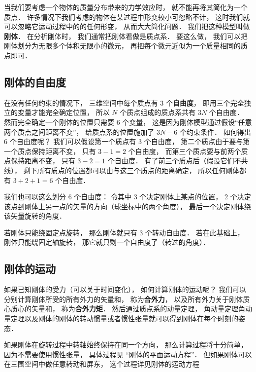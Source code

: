 

当我们要考虑一个物体的质量分布带来的力学效应时， 就不能再将其简化为一个质点． 许多情况下我们考虑的物体在某过程中形变较小可忽略不计， 这时我们就可以忽略它运动过程中的的任何形变， 从而大大简化问题． 我们把这种模型叫做\textbf{刚体}． 在分析刚体时， 我们通常把刚体看做是质点系． 要这么做， 我们可以把刚体划分为无限多个体积无限小的微元， 再把每个微元近似为一个质量相同的质点即可． 

\subsection{刚体的自由度}

在没有任何约束的情况下， 三维空间中每个质点有 3 个\textbf{自由度}， 即用三个完全独立的变量才能完全确定位置， 所以 $N$ 个质点组成的质点系共有 $3N$ 个自由度． 然而完全确定一个刚体的位置只需要 6 个变量， 这是因为刚体模型通过假设“任意两个质点之间距离不变”， 给质点系的位置施加了 $3N - 6$ 个约束条件． 如何得出 6 个自由度呢？ 我们可以假设第一个质点有 3 个自由度， 第二个质点由于要与第一个质点保持距离不变， 只有 $3 - 1 = 2$ 个自由度， 而第三个质点要与前两个质点保持距离不变， 只有 $3 - 2 = 1$ 个自由度． 有了前三个质点后（假设它们不共线）， 剩下所有质点的位置都可以由与这三个质点的距离确定， 所以任何刚体都有 $3 + 2 + 1 = 6$ 个自由度．

我们也可以这么划分 6 个自由度： 令其中 3 个决定刚体上某点的位置， 2 个决定该点到刚体上另一点的矢量的方向（球坐标中的两个角度）， 最后一个决定刚体绕该矢量旋转的角度．

若刚体只能绕固定点旋转， 那么刚体就只有 3 个转动自由度． 若在此基础上， 刚体只能绕固定轴旋转， 那它就只剩一个自由度了（转过的角度）．

\subsection{刚体的运动}
如果已知刚体的受力（可以关于时间变化）， 如何计算刚体的运动呢？ 我们可以分别计算刚体所受的所有外力的矢量和， 称为\textbf{合外力}， 以及所有外力关于刚体质心质心的矢量和， 称为\textbf{合外力矩}． 然后通过质点系的动量定理， 角动量定理角动量定理以及刚体的刚体的转动惯量或者惯性张量就可以得到刚体在每个时刻的姿态．

如果刚体在旋转过程中转轴始终保持在同一个方向， 那么计算过程将十分简单， 因为不需要使用惯性张量， 具体过程见 “刚体的平面运动方程”． 但如果刚体可以在三围空间中做任意转动和屏东， 这个过程详见刚体的运动方程
